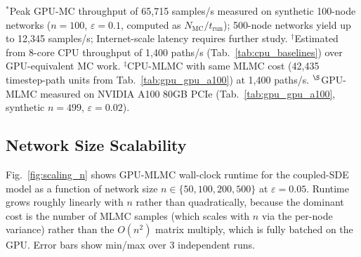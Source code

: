 \documentclass{ieeeaccess}
\begin{document}
\begin{table}[!t]
\caption{Capability Comparison Across Simulation Frameworks}
\label{tab:capability}
\centering
{}
\vspace{2pt}\footnotesize $^*$Peak GPU-MC throughput of 65,715 samples/s measured on synthetic
100-node networks ($n\!=\!100$, $\varepsilon=0.1$, computed as $N_{\text{MC}}/t_{\text{run}}$);
500-node networks yield up to 12,345 samples/s; Internet-scale latency requires further study.
$^\dagger$Estimated from 8-core CPU throughput of 1,400 paths/s (Tab.~\ref{tab:cpu_baselines})
over GPU-equivalent MC work. $^\ddagger$CPU-MLMC with same MLMC cost (42,435 timestep-path units
from Tab.~\ref{tab:gpu_gpu_a100}) at 1,400 paths/s. $^\S$GPU-MLMC measured on NVIDIA A100 80GB
PCIe (Tab.~\ref{tab:gpu_gpu_a100}, synthetic $n{=}499$, $\varepsilon{=}0.02$).\normalsize
\end{table}

\subsection{Network Size Scalability}
\label{subsec:scaling}

Fig.~\ref{fig:scaling_n} shows GPU-MLMC wall-clock runtime for the coupled-SDE model as a
function of network size $n \in \{50, 100, 200, 500\}$ at $\varepsilon=0.05$. Runtime grows
roughly linearly with $n$ rather than quadratically, because the dominant cost is the number of
MLMC samples (which scales with $n$ via the per-node variance) rather than the $O(n^2)$ matrix
multiply, which is fully batched on the GPU. Error bars show min/max over 3 independent runs.
\end{document}
